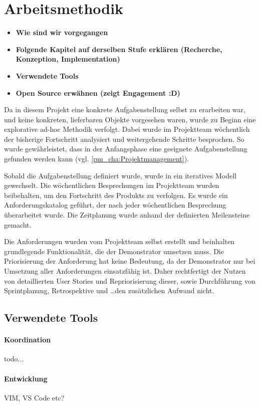 \section{Arbeitsmethodik}
\label{sec:Arbeitsmethodik}
\begin{itemize}
    \item \textbf{Wie sind wir vorgegangen}
    \item \textbf{Folgende Kapitel auf derselben Stufe erklären (Recherche, Konzeption, Implementation)}
    \item \textbf{Verwendete Tools}
    \item \textbf{Open Source erwähnen (zeigt Engagement :D)}
\end{itemize}
Da in diesem Projekt eine konkrete Aufgabenstellung selbst zu erarbeiten war, und keine konkreten, lieferbaren Objekte vorgesehen waren, wurde zu Beginn eine explorative ad-hoc Methodik verfolgt. Dabei wurde im Projektteam wöchentlich der bisherige Fortschritt analysiert und weitergehende Schritte besprochen. So wurde gewährleistet, dass in der Anfangsphase eine geeignete Aufgabenstellung gefunden werden kann (vgl. \ref{pm_cha:Projektmanagement}).

Sobald die Aufgabenstellung definiert wurde, wurde in ein iteratives Modell gewechselt. Die wöchentlichen Besprechungen im Projektteam wurden beibehalten, um den Fortschritt des Produkts zu verfolgen. Es wurde ein Anforderungskatalog geführt, der nach jeder wöchentlichen Besprechung überarbeitet wurde. Die Zeitplanung wurde anhand der definierten Meilensteine gemacht.

Die Anforderungen wurden vom Projektteam selbst erstellt und beinhalten grundlegende Funktionalität, die der Demonstrator umsetzen muss. Die Priorisierung der Anforderung hat keine Bedeutung, da der Demonstrator nur bei Umsetzung aller Anforderungen einsatzfähig ist. Daher rechtfertigt der Nutzen von detaillierten User Stories und Repriorisierung dieser, sowie Durchführung von Sprintplanung, Retrospektive und \dots den zusätzlichen Aufwand nicht.

\subsection{Verwendete Tools}
\paragraph{Koordination}
todo...

\paragraph{Entwicklung}
VIM, VS Code etc?



